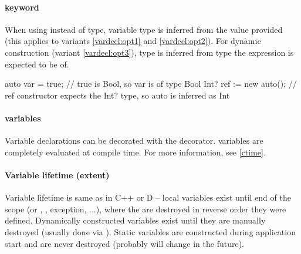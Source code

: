 \paragraph{ keyword}
When using  instead of type, variable type is inferred from the value provided (this applies to variants \ref{vardecl:opt1} and \ref{vardecl:opt2}). For dynamic construction (variant \ref{vardecl:opt3}), type is inferred from type the expression is expected to be of.

\begin{code}
auto var = true; // true is Bool, so var is of type Bool
Int? ref := new auto(); // ref constructor expects the Int? type, so auto is inferred as Int
\end{code}

\paragraph{ variables}
Variable declarations can be decorated with the  decorator.  variables are completely evaluated at compile time. For more information, see \autoref{ctime}.

\paragraph{Variable lifetime (extent)} Variable lifetime is same as in C++ or D -- local variables exist until end of the scope (or , , exception, ...), where the are destroyed in reverse order they were defined. Dynamically constructed variables exist until they are manually destroyed (usually done via ). Static variables are constructed during application start and are never destroyed (probably will change in the future).

